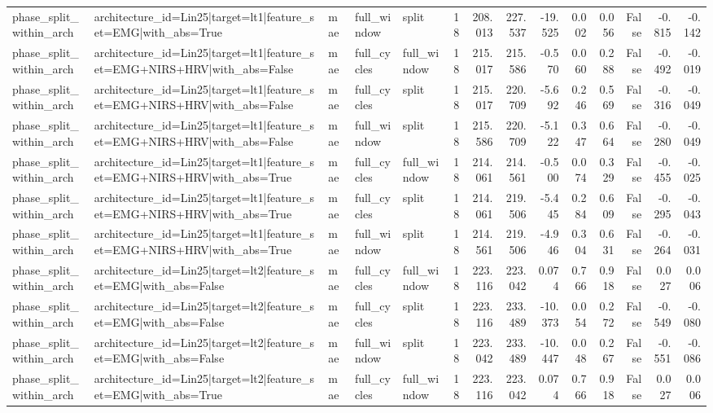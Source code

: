 \begin{table}
\begin{tabular}{lllllrrrrrrrrr}
phase_split_within_arch & architecture_id=Lin25|target=lt1|feature_set=EMG|with_abs=True & mae & full_window & split & 18 & 208.013 & 227.537 & -19.525 & 0.002 & 0.056 & False & -0.815 & -0.142 \\
phase_split_within_arch & architecture_id=Lin25|target=lt1|feature_set=EMG+NIRS+HRV|with_abs=False & mae & full_cycles & full_window & 18 & 215.017 & 215.586 & -0.570 & 0.060 & 0.288 & False & -0.492 & -0.019 \\
phase_split_within_arch & architecture_id=Lin25|target=lt1|feature_set=EMG+NIRS+HRV|with_abs=False & mae & full_cycles & split & 18 & 215.017 & 220.709 & -5.692 & 0.246 & 0.569 & False & -0.316 & -0.049 \\
phase_split_within_arch & architecture_id=Lin25|target=lt1|feature_set=EMG+NIRS+HRV|with_abs=False & mae & full_window & split & 18 & 215.586 & 220.709 & -5.122 & 0.347 & 0.664 & False & -0.280 & -0.049 \\
phase_split_within_arch & architecture_id=Lin25|target=lt1|feature_set=EMG+NIRS+HRV|with_abs=True & mae & full_cycles & full_window & 18 & 214.061 & 214.561 & -0.500 & 0.074 & 0.329 & False & -0.455 & -0.025 \\
phase_split_within_arch & architecture_id=Lin25|target=lt1|feature_set=EMG+NIRS+HRV|with_abs=True & mae & full_cycles & split & 18 & 214.061 & 219.506 & -5.445 & 0.284 & 0.609 & False & -0.295 & -0.043 \\
phase_split_within_arch & architecture_id=Lin25|target=lt1|feature_set=EMG+NIRS+HRV|with_abs=True & mae & full_window & split & 18 & 214.561 & 219.506 & -4.946 & 0.304 & 0.631 & False & -0.264 & -0.031 \\
phase_split_within_arch & architecture_id=Lin25|target=lt2|feature_set=EMG|with_abs=False & mae & full_cycles & full_window & 18 & 223.116 & 223.042 & 0.074 & 0.766 & 0.918 & False & 0.027 & 0.006 \\
phase_split_within_arch & architecture_id=Lin25|target=lt2|feature_set=EMG|with_abs=False & mae & full_cycles & split & 18 & 223.116 & 233.489 & -10.373 & 0.054 & 0.272 & False & -0.549 & -0.080 \\
phase_split_within_arch & architecture_id=Lin25|target=lt2|feature_set=EMG|with_abs=False & mae & full_window & split & 18 & 223.042 & 233.489 & -10.447 & 0.048 & 0.267 & False & -0.551 & -0.086 \\
phase_split_within_arch & architecture_id=Lin25|target=lt2|feature_set=EMG|with_abs=True & mae & full_cycles & full_window & 18 & 223.116 & 223.042 & 0.074 & 0.766 & 0.918 & False & 0.027 & 0.006 \\

\end{tabular}
\end{table}
